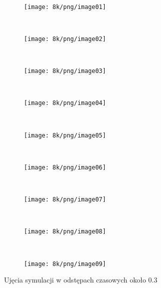 \paragraph{}
\begin{figure}[H]
\centering     %

\begin{subfigure}[b]{0.3\textwidth}
\texttt{[image: 8k/png/image01]}%
\end{subfigure}
~
\begin{subfigure}[b]{0.3\textwidth}
\texttt{[image: 8k/png/image02]}%
\end{subfigure}
~
\begin{subfigure}[b]{0.3\textwidth}
\texttt{[image: 8k/png/image03]}%
\end{subfigure}
\\
\vspace{1em}
\begin{subfigure}[b]{0.3\textwidth}
\texttt{[image: 8k/png/image04]}%
\end{subfigure}
~
\begin{subfigure}[b]{0.3\textwidth}
\texttt{[image: 8k/png/image05]}%
\end{subfigure}
~
\begin{subfigure}[b]{0.3\textwidth}
\texttt{[image: 8k/png/image06]}%
\end{subfigure}
\\
\vspace{1em}
\begin{subfigure}[b]{0.3\textwidth}
\texttt{[image: 8k/png/image07]}%
\end{subfigure}
~
\begin{subfigure}[b]{0.3\textwidth}
\texttt{[image: 8k/png/image08]}%
\end{subfigure}
~
\begin{subfigure}[b]{0.3\textwidth}
\texttt{[image: 8k/png/image09]}%
\end{subfigure}

\caption{Ujęcia symulacji w odstępach czasowych około 0.3}
\label{fig:ss_8k}
\end{figure}

